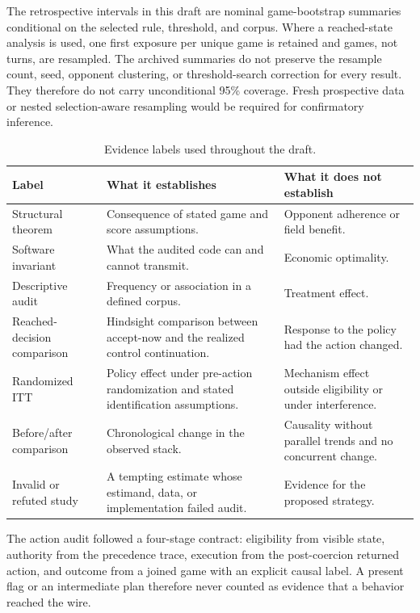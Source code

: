 The retrospective intervals in this draft are nominal game-bootstrap summaries
conditional on the selected rule, threshold, and corpus. Where a reached-state
analysis is used, one first exposure per unique game is retained and games, not
turns, are resampled. The archived summaries do not preserve the resample count,
seed, opponent clustering, or threshold-search correction for every result.
They therefore do not carry unconditional 95\% coverage. Fresh prospective
data or nested selection-aware resampling would be required for confirmatory
inference.

\begin{table}[h]
\centering
\small
\caption{Evidence labels used throughout the draft.}
\label{tab:evidence_labels}
\begin{tabularx}{\linewidth}{@{}p{2.5cm}p{4.4cm}Y@{}}
\toprule
Label & What it establishes & What it does not establish \\
\midrule
Structural theorem & Consequence of stated game and score assumptions. & Opponent adherence or field benefit. \\
Software invariant & What the audited code can and cannot transmit. & Economic optimality. \\
Descriptive audit & Frequency or association in a defined corpus. & Treatment effect. \\
Reached-decision comparison & Hindsight comparison between accept-now and the realized control continuation. & Response to the policy had the action changed. \\
Randomized ITT & Policy effect under pre-action randomization and stated identification assumptions. & Mechanism effect outside eligibility or under interference. \\
Before/after comparison & Chronological change in the observed stack. & Causality without parallel trends and no concurrent change. \\
Invalid or refuted study & A tempting estimate whose estimand, data, or implementation failed audit. & Evidence for the proposed strategy. \\
\bottomrule
\end{tabularx}
\end{table}

The action audit followed a four-stage contract: eligibility from visible state, authority from
the precedence trace, execution from the post-coercion returned action, and
outcome from a joined game with an explicit causal label. A present flag or an
intermediate plan therefore never counted as evidence that a behavior reached
the wire.

